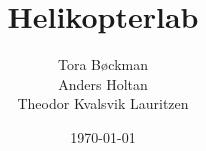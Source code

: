 \documentclass[12pt, a4paper, norsk]{article}
\begin{document}
\title{Helikopterlab}
\author{Tora Bøckman \\ Anders Holtan \\ Theodor Kvalsvik Lauritzen}

\date{\today}

\maketitle




\end{document}
